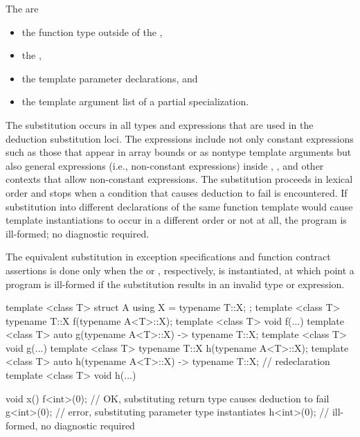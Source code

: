 \pnum
{}%
The  are
\begin{itemize}
\item the function type outside of the ,
\item the ,
\item the template parameter declarations, and
\item the template argument list of a partial specialization.
\end{itemize}
The substitution occurs in all types and expressions that are used
in the deduction substitution loci.
The expressions include not only
constant expressions such as those that appear in array bounds or as nontype
template arguments but also general expressions (i.e., non-constant expressions)
inside , , and other contexts that allow non-constant
expressions. The substitution proceeds in lexical order and stops when
a condition that causes deduction to fail is encountered.
If substitution into different declarations of the same function template would
cause template instantiations to occur in a different order or not at all,
the program is ill-formed; no diagnostic required.
\begin{note}
The equivalent substitution in
exception specifications
and function contract assertions
is done only when
the 
or , respectively,
is instantiated,
at which point a program is ill-formed
if the substitution results in an invalid type or expression.
\end{note}
\begin{example}
\begin{codeblock}
template <class T> struct A { using X = typename T::X; };
template <class T> typename T::X f(typename A<T>::X);
template <class T> void f(...) { }
template <class T> auto g(typename A<T>::X) -> typename T::X;
template <class T> void g(...) { }
template <class T> typename T::X h(typename A<T>::X);
template <class T> auto h(typename A<T>::X) -> typename T::X;   // redeclaration
template <class T> void h(...) { }

void x() {
  f<int>(0);        // OK, substituting return type causes deduction to fail
  g<int>(0);        // error, substituting parameter type instantiates 
  h<int>(0);        // ill-formed, no diagnostic required
}
\end{codeblock}
\end{example}

